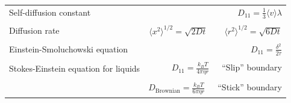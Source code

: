 \documentclass[11pt]{article}
\begin{document}
\begin{table}
\begin{center}
\begin{tabular}{|lr|}
Self-diffusion constant &
$\displaystyle D_{11} = \frac{1}{3}\langle v \rangle \lambda $ \\ & \\

Diffusion rate &
$\displaystyle \langle x^2 \rangle^{1/2} = \sqrt{2 D t} $\ \ \ \  $\langle r^2 \rangle^{1/2} = \sqrt{6
D t}$ \\ & \\

Einstein-Smoluchowski equation & $\displaystyle D_{11}= \frac{\delta^2}{2\tau}$ \\ & \\

Stokes-Einstein equation for liquids & $\displaystyle D_{11}=\frac{k_BT}{4\pi\eta r}$\ \ \
``Slip'' boundary \\
 & \\
 & $\displaystyle D_\mathrm{Brownian}=\frac{k_BT}{6\pi\eta r}$\ \ \ ``Stick'' boundary \\
\hline
    \end{tabular}
\end{center}
 \end{table}
\end{document}
